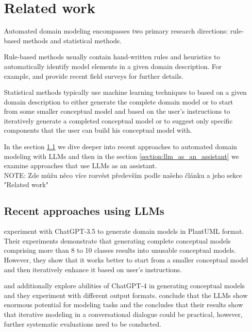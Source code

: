 \chapter{Related work}

Automated domain modeling encompasses two primary research directions: rule-based methods and statistical methods.

Rule-based methods usually contain hand-written rules and heuristics to automatically identify model elements in a given domain description. For example, \citet{Raharjana2021} and \citet{Sonbol2022} provide recent field surveys for further details.

Statistical methods typically use machine learning techniques to based on a given domain description to either generate the complete domain model \cite{Chen2023,Saeedizade2024} or to start from some smaller conceptual model and based on the user's instructions to iteratively generate a completed conceptual model \cite{Camara2023} or to suggest only specific components that the user can build his conceptual model with.

In the section \ref{section:ref_recent_approaches_using_llms} we dive deeper into recent approaches to automated domain modeling with LLMs and then in the section \ref{section:llm_as_an_assistant} we examine approaches that use LLMs as an assistant. \\

NOTE: Zde můžu něco více rozvést především podle našeho článku a jeho sekce "Related work"


\section{Recent approaches using LLMs}
\label{section:ref_recent_approaches_using_llms}

\citet{Camara2023} experiment with ChatGPT-3.5 to generate domain models in PlantUML format. Their experiments demonstrate that generating complete conceptual models comprising more than 8 to 10 classes results into unusable conceptual models. However, they show that it works better to start from a smaller conceptual model and then iteratively enhance it based on user's instructions.

\citet{Fill2023} and \citet{Haerer2023} additionally explore abilities of ChatGPT-4 in generating conceptual models and they experiment with different output formats. \citet{Fill2023} conclude that the LLMs show enormous potential for modeling tasks and the \citet{Haerer2023} concludes that their results show that iterative modeling in a conversational dialogue could be practical, however, further systematic evaluations need to be conducted.

